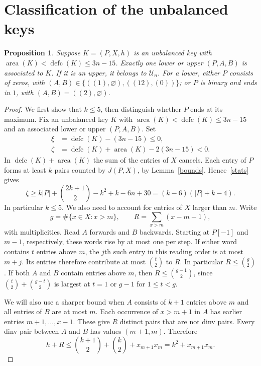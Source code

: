 \documentclass[11pt]{article}
\DeclareMathOperator{\area}{area}\DeclareMathOperator{\dinv}{dinv}
\DeclareMathOperator{\defc}{defc}\DeclareMathOperator{\sym}{sym}
\newtheorem{proposition}[theorem]{Proposition}
\begin{document}
\section{Classification of the unbalanced keys}
\begin{proposition}\label{exceptions}
Suppose $K=(P,X,h)$ is an unbalanced key with $\area(K)<\defc(K)\le3n-15$. Exactly one lower or upper $(P,A,B)$ is associated to $K$. If it is an upper, it belongs to $\mathcal U_n$. For a lower, either $P$ consists of zeros, with $(A,B)\in\{((1),\varnothing),((12),(0))\}$; or $P$ is binary and ends in $1$, with $(A,B)=((2),\varnothing)$.
\end{proposition}
\begin{proof}
We first show that $k\le5$, then distinguish whether $P$ ends at its maximum. Fix an unbalanced key $K$ with $\area(K)<\defc(K)\le3n-15$ and an associated lower or upper $(P,A,B)$. Set
\[
 \begin{aligned}
 \xi&=\defc(K)-(3n-15)\le0,\\
 \zeta&=\defc(K)+\area(K)-2(3n-15)<0.
 \end{aligned}
\]
In $\defc(K)+\area(K)$ the sum of the entries of $X$ cancels. Each entry of $P$ forms at least $k$ pairs counted by $J(P,X)$, by Lemma~\ref{bounds}. Hence~\eqref{stats} gives
\[
 \zeta\ge k|P|+\binom{2k+1}{2}-k^2+k-6n+30=(k-6)(|P|+k-4).
\]
In particular $k\le5$. We also need to account for entries of $X$ larger than $m$. Write
\[
 g=\#\{x\in X:x>m\},\qquad R=\sum_{x>m}(x-m-1),
\]
with multiplicities. Read $A$ forwards and $B$ backwards. Starting at $P[-1]$ and $m-1$, respectively, these words rise by at most one per step. If either word contains $t$ entries above $m$, the $j$th such entry in this reading order is at most $m+j$. Its entries therefore contribute at most $\binom t2$ to $R$. In particular $R\le\binom g2$. If both $A$ and $B$ contain entries above $m$, then $R\le\binom{g-1}2$, since $\binom{t}{2}+\binom{g-t}{2}$ is largest at $t=1$ or $g-1$ for $1\le t<g$.

We will also use a sharper bound when $A$ consists of $k+1$ entries above $m$ and all entries of $B$ are at most $m$. Each occurrence of $x>m+1$ in $A$ has earlier entries $m+1,\ldots,x-1$. These give $R$ distinct pairs that are not dinv pairs. Every dinv pair between $A$ and $B$ has values $(m+1,m)$. Therefore
\begin{equation}\label{oneword}
 h+R\le\binom{k+1}2+\binom k2+x_{m+1}x_m=k^2+x_{m+1}x_m.
\end{equation}


\end{proof}
\end{document}
